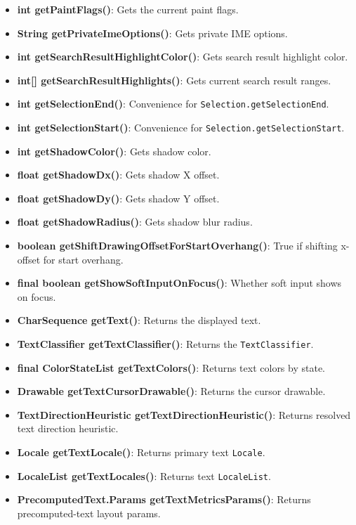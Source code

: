 \documentclass{report}
\begin{document}
\begin{itemize}
\begin{itemize}
                \item \textbf{int getPaintFlags()}: Gets the current paint flags.
                \item \textbf{String getPrivateImeOptions()}: Gets private IME options.
                \item \textbf{int getSearchResultHighlightColor()}: Gets search result highlight color.
                \item \textbf{int[] getSearchResultHighlights()}: Gets current search result ranges.
                \item \textbf{int getSelectionEnd()}: Convenience for \texttt{Selection.getSelectionEnd}.
                \item \textbf{int getSelectionStart()}: Convenience for \texttt{Selection.getSelectionStart}.
                \item \textbf{int getShadowColor()}: Gets shadow color.
                \item \textbf{float getShadowDx()}: Gets shadow X offset.
                \item \textbf{float getShadowDy()}: Gets shadow Y offset.
                \item \textbf{float getShadowRadius()}: Gets shadow blur radius.
                \item \textbf{boolean getShiftDrawingOffsetForStartOverhang()}: True if shifting x-offset for start overhang.
                \item \textbf{final boolean getShowSoftInputOnFocus()}: Whether soft input shows on focus.
                \item \textbf{CharSequence getText()}: Returns the displayed text.
                \item \textbf{TextClassifier getTextClassifier()}: Returns the \texttt{TextClassifier}.
                \item \textbf{final ColorStateList getTextColors()}: Returns text colors by state.
                \item \textbf{Drawable getTextCursorDrawable()}: Returns the cursor drawable.
                \item \textbf{TextDirectionHeuristic getTextDirectionHeuristic()}: Returns resolved text direction heuristic.
                \item \textbf{Locale getTextLocale()}: Returns primary text \texttt{Locale}.
                \item \textbf{LocaleList getTextLocales()}: Returns text \texttt{LocaleList}.
                \item \textbf{PrecomputedText.Params getTextMetricsParams()}: Returns precomputed-text layout params.

\end{itemize}
\end{itemize}
\end{document}

